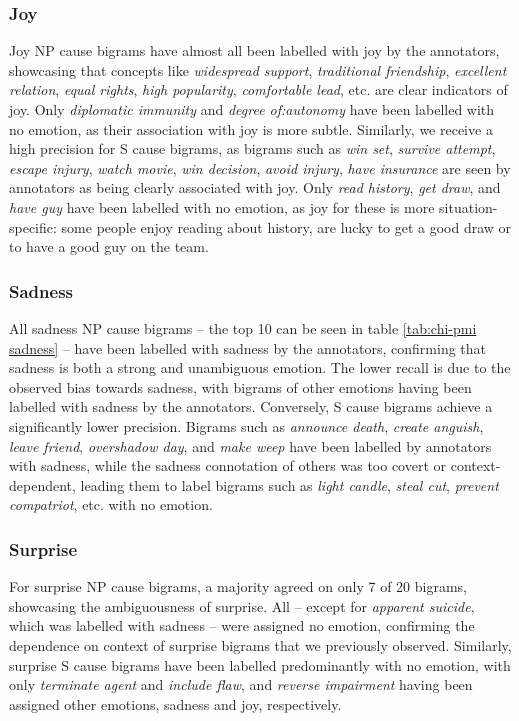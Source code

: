\subsubsection{Joy}

Joy NP cause bigrams have almost all been labelled with joy by the annotators, showcasing that concepts like \textit{widespread support}, \textit{traditional friendship}, \textit{excellent relation}, \textit{equal rights}, \textit{high popularity}, \textit{comfortable lead}, etc. are clear indicators of joy. Only \textit{diplomatic immunity} and \textit{degree of:autonomy} have been labelled with no emotion, as their association with joy is more subtle.
Similarly, we receive a high precision for S cause bigrams, as bigrams such as \textit{win set}, \textit{survive attempt}, \textit{escape injury}, \textit{watch movie}, \textit{win decision}, \textit{avoid injury}, \textit{have insurance} are seen by annotators as being clearly associated with joy. Only \textit{read history}, \textit{get draw}, and \textit{have guy} have been labelled with no emotion, as joy for these is more situation-specific: some people enjoy reading about history, are lucky to get a good draw or to have a good guy on the team.

\subsubsection{Sadness}

All sadness NP cause bigrams -- the top 10 can be seen in table \ref{tab:chi-pmi sadness} -- have been labelled with sadness by the annotators, confirming that sadness is both a strong and unambiguous emotion. The lower recall is due to the observed bias towards sadness, with bigrams of other emotions having been labelled with sadness by the annotators.
Conversely, S cause bigrams achieve a significantly lower precision. Bigrams such as \textit{announce death}, \textit{create anguish}, \textit{leave friend}, \textit{overshadow day}, and \textit{make weep} have been labelled by annotators with sadness, while the sadness connotation of others was too covert or context-dependent, leading them to label bigrams such as \textit{light candle}, \textit{steal cut}, \textit{prevent compatriot}, etc. with no emotion.

\subsubsection{Surprise}

For surprise NP cause bigrams, a majority agreed on only 7 of 20 bigrams, showcasing the ambiguousness of surprise. All -- except for \textit{apparent suicide}, which was labelled with sadness -- were assigned no emotion, confirming the dependence on context of surprise bigrams that we previously observed.
Similarly, surprise S cause bigrams have been labelled predominantly with no emotion, with only \textit{terminate agent} and \textit{include flaw}, and \textit{reverse impairment} having been assigned other emotions, sadness and joy, respectively.

